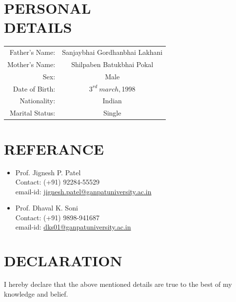 \documentclass[margin]{res}
\begin{document}
    \section{PERSONAL \\ DETAILS}
    \begin{tabular}{r c}       
        Father's Name: & Sanjaybhai Gordhanbhai Lakhani\\
        Mother's Name: & Shilpaben Batukbhai Pokal\\
        Sex: & Male\\
        Date of Birth: & $3^{rd} \ march, $1998\\
        Nationality: & Indian \\
        Marital Status: & Single \\
    \end{tabular}

    \section{REFERANCE}
    \begin{itemize}
        \item Prof. Jignesh P. Patel\\ 
            Contact: (+91) 92284-55529\\
            email-id: \href{jignesh.patel@ganpatuniversity.ac.in}{jignesh.patel@ganpatuniversity.ac.in}\\
        \item Prof. Dhaval K. Soni\\ 
            Contact: (+91) 9898-941687\\
            email-id: \href{dks01@ganpatuniversity.ac.in}{dks01@ganpatuniversity.ac.in}
    \end{itemize}

    \section{DECLARATION}
    {I hereby declare that the above mentioned details are true to the best of my knowledge and belief.}

    
\(\)
\end{document}

